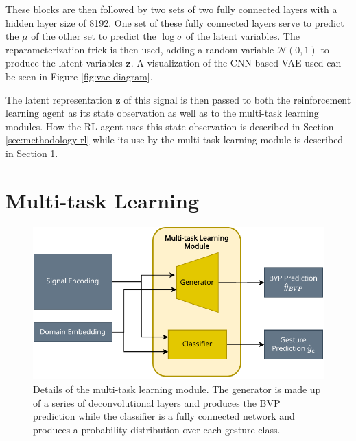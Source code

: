 These blocks are then followed by two sets of two fully connected layers with a hidden layer size of 8192.
One set of these fully connected layers serve to predict the $\mu$ of the other set to predict the $\log \sigma$ of the latent variables.
The reparameterization trick is then used, adding a random variable $\mathcal{N}(0, 1)$ to produce the latent variables $\boldsymbol{z}$.
A visualization of the CNN-based VAE used can be seen in Figure \ref{fig:vae-diagram}.

The latent representation $\boldsymbol{z}$ of this signal is then passed to both the reinforcement learning agent as its state observation as well as to the multi-task learning modules.
How the RL agent uses this state observation is described in Section \ref{sec:methodology-rl} while its use by the multi-task learning module is described in Section \ref{sec:methodology-multi-task-learning}.

\section{Multi-task Learning}\label{sec:methodology-multi-task-learning}

\begin{figure}
	\centering
	\includegraphics[width=0.8\linewidth]{figures/multitask_learning_module_diagram.pdf}
	\caption{Details of the multi-task learning module. The generator is made up of a series of deconvolutional layers and produces the BVP prediction while the classifier is a fully connected network and produces a probability distribution over each gesture class.}
	\label{fig:multitask-learning-module-diagram}
\end{figure}

